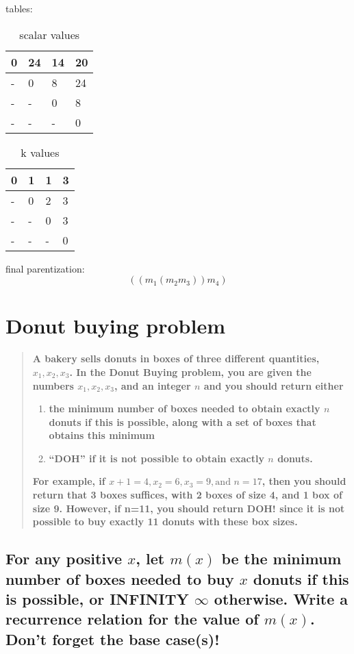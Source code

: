 \documentclass[titlepage]{article}\usepackage[]{graphicx}\usepackage[]{color}
\begin{document}
tables:
\begin{table}[h]
	\caption{scalar values}
	\label{tab:mylabel}
	\begin{tabular}{|l|l|l|l|}
		\hline
		0 & 24 & 14 & 20 \\ \hline
		- & 0  & 8  & 24 \\ \hline
		- & -  & 0  & 8  \\ \hline
		- & -  & -  & 0  \\ \hline
	\end{tabular}
\end{table}

\begin{table}[h]
	\caption{k values}
	\label{tab:kval}
	\begin{tabular}{|l|l|l|l|}
		\hline
		0 & 1 & 1 & 3 \\ \hline
		- & 0  & 2  & 3 \\ \hline
		- & -  & 0  & 3  \\ \hline
		- & -  & -  & 0  \\ \hline
	\end{tabular}
\end{table}

final parentization:
\[ \left( (m_1 (m_2 m_3)) m_4 \right)\]

\section{Donut buying problem}
\begin{quote}
	\textbf{A bakery sells donuts in boxes of three different quantities, $x_1, x_2,
		x_3$. In the Donut Buying problem, you are given the numbers $x_1, x_2,
		x_3$, and an integer $n$ and you should return either }
	\begin{enumerate}
		\item \textbf{the minimum number of boxes needed to obtain exactly $n$ donuts if
			this is possible, along with a set of boxes that obtains this minimum}
		\item \textbf{``DOH'' if it is not possible to obtain exactly $n$ donuts. }
	\end{enumerate}
	\textbf{For example, if $x+1 = 4, x_2 =6, x_3 = 9, \text{and } n=17$, then you should
	return that 3 boxes suffices, with 2 boxes of size 4, and 1 box of size 9.
	However, if n=11, you should return DOH! since it is not possible to buy
exactly 11 donuts with these box sizes. }
\end{quote}

\subsection{For any positive $x$, let $m(x)$ be the minimum number of boxes
  needed to buy $x$ donuts if this is possible, or INFINITY $\infty$
  otherwise. Write a recurrence relation for the value of $m(x)$. Don't forget
the base case(s)!}
\end{document}
